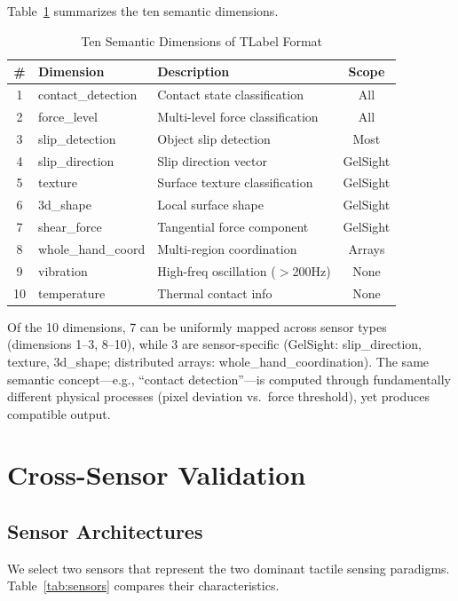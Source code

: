 \documentclass[conference]{IEEEtran}
\begin{document}
Table~\ref{tab:dimensions} summarizes the ten semantic dimensions.

\begin{table}[t]
\centering
\caption{Ten Semantic Dimensions of TLabel Format}
\label{tab:dimensions}
\begin{tabular}{cllc}
\toprule
\# & Dimension & Description & Scope \\
\midrule
1 & contact\_detection & Contact state classification & All \\
2 & force\_level & Multi-level force classification & All \\
3 & slip\_detection & Object slip detection & Most \\
4 & slip\_direction & Slip direction vector & GelSight \\
5 & texture & Surface texture classification & GelSight \\
6 & 3d\_shape & Local surface shape & GelSight \\
7 & shear\_force & Tangential force component & GelSight \\
8 & whole\_hand\_coord & Multi-region coordination & Arrays \\
9 & vibration & High-freq oscillation ($>$200Hz) & None \\
10 & temperature & Thermal contact info & None \\
\bottomrule
\end{tabular}
\end{table}

Of the 10 dimensions, 7 can be uniformly mapped across sensor types (dimensions 1--3, 8--10), while 3 are sensor-specific (GelSight: slip\_direction, texture, 3d\_shape; distributed arrays: whole\_hand\_coordination). The same semantic concept---e.g., ``contact detection''---is computed through fundamentally different physical processes (pixel deviation vs.\ force threshold), yet produces compatible output.

\section{Cross-Sensor Validation}

\subsection{Sensor Architectures}

We select two sensors that represent the two dominant tactile sensing paradigms. Table~\ref{tab:sensors} compares their characteristics.
\end{document}
